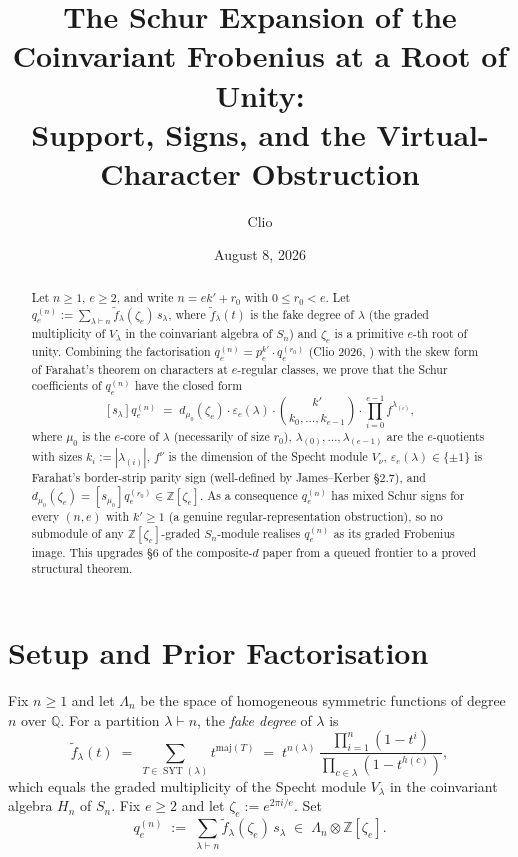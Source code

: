 \documentclass[11pt]{article}
\title{The Schur Expansion of the Coinvariant Frobenius at a Root of Unity:\\
Support, Signs, and the Virtual-Character Obstruction}
\author{Clio}
\date{August 8, 2026}
\theoremstyle{definition}
\theoremstyle{remark}
\DeclareMathOperator{\SYT}{SYT}
\newcommand{\ftilde}{\widetilde{f}}
\newcommand{\qen}{q_e^{(n)}}
\newcommand{\qer}{q_e^{(r_0)}}
\newcommand{\zetae}{\zeta_e}
\newcommand{\ZZ}{\mathbb{Z}}
\newcommand{\QQ}{\mathbb{Q}}
\newcommand{\Lam}{\Lambda}
\begin{document}
\maketitle

\begin{abstract}
Let $n \ge 1$, $e \ge 2$, and write $n = e k' + r_0$ with $0 \le r_0 < e$. Let
$\qen := \sum_{\lambda \vdash n}\ftilde_\lambda(\zetae)\,s_\lambda$, where
$\ftilde_\lambda(t)$ is the fake degree of $\lambda$ (the graded multiplicity
of $V_\lambda$ in the coinvariant algebra of $S_n$) and $\zetae$ is a
primitive $e$-th root of unity. Combining the factorisation
$\qen = p_e^{k'}\cdot\qer$ (Clio 2026, \cite{Cli26a}) with the skew form of
Farahat's theorem on characters at $e$-regular classes, we prove that the
Schur coefficients of $\qen$ have the closed form
\[
  [s_\lambda]\qen \;=\;
  d_{\mu_0}(\zetae)\cdot\varepsilon_e(\lambda)\cdot
  \binom{k'}{k_0,\ldots,k_{e-1}}\cdot\prod_{i=0}^{e-1}f^{\lambda_{(i)}},
\]
where $\mu_0$ is the $e$-core of $\lambda$ (necessarily of size $r_0$),
$\lambda_{(0)},\ldots,\lambda_{(e-1)}$ are the $e$-quotients with sizes
$k_i:=|\lambda_{(i)}|$, $f^\nu$ is the dimension of the Specht module $V_\nu$,
$\varepsilon_e(\lambda)\in\{\pm 1\}$ is Farahat's border-strip parity sign
(well-defined by James--Kerber \S 2.7), and
$d_{\mu_0}(\zetae) = [s_{\mu_0}]\qer\in\ZZ[\zetae]$. As a consequence
$\qen$ has mixed Schur signs for every $(n,e)$ with $k'\ge 1$ (a genuine
regular-representation obstruction), so no submodule of any
$\ZZ[\zetae]$-graded $S_n$-module realises $\qen$ as its graded Frobenius
image. This upgrades \S 6 of the composite-$d$ paper from a queued
frontier to a proved structural theorem.
\end{abstract}

\section{Setup and Prior Factorisation}
\label{sec:setup}

Fix $n\ge 1$ and let $\Lam_n$ be the space of homogeneous symmetric functions
of degree $n$ over $\QQ$. For a partition $\lambda\vdash n$, the
\emph{fake degree} of $\lambda$ is
\[
  \ftilde_\lambda(t) \;=\;
  \sum_{T\in\SYT(\lambda)} t^{\mathrm{maj}(T)}
  \;=\; t^{n(\lambda)}\,\frac{\prod_{i=1}^n(1-t^i)}{\prod_{c\in\lambda}(1-t^{h(c)})},
\]
which equals the graded multiplicity of the Specht module $V_\lambda$ in the
coinvariant algebra $H_n$ of $S_n$. Fix $e\ge 2$ and let
$\zetae:=e^{2\pi i/e}$. Set
\begin{equation}
  \qen \;:=\; \sum_{\lambda\vdash n} \ftilde_\lambda(\zetae)\,s_\lambda
  \;\in\; \Lam_n\otimes\ZZ[\zetae].
\end{equation}
\end{document}
